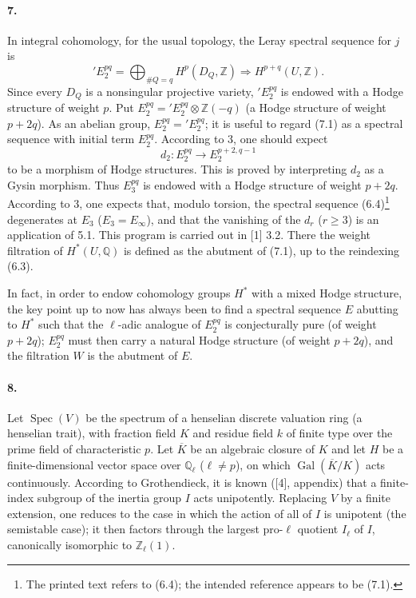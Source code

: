 \documentclass[10pt]{article}
\newcommand{\Q}{\mathbb Q}
\newcommand{\Z}{\mathbb Z}
\newcommand{\Ql}{\mathbb Q_\ell}
\newcommand{\Zl}{\mathbb Z_\ell}
\newcommand{\Gal}{\operatorname{Gal}}
\newcommand{\Spec}{\operatorname{Spec}}
\newcommand{\barK}{\overline{K}}
\begin{document}
\paragraph{7.} In integral cohomology, for the usual topology, the Leray spectral sequence for $j$ is
\[
\tag{7.1}
{}'E_2^{pq}=\bigoplus_{\#Q=q}H^p(D_Q,\Z)\Rightarrow H^{p+q}(U,\Z).
\]
Since every $D_Q$ is a nonsingular projective variety, ${}'E_2^{pq}$ is endowed with a Hodge structure of weight $p$. Put $E_2^{pq}={}'E_2^{pq}\otimes\Z(-q)$ (a Hodge structure of weight $p+2q$). As an abelian group, $E_2^{pq}={}'E_2^{pq}$; it is useful to regard (7.1) as a spectral sequence with initial term $E_2^{pq}$. According to 3, one should expect
\[
d_2:E_2^{pq}\to E_2^{p+2,q-1}
\]
to be a morphism of Hodge structures. This is proved by interpreting $d_2$ as a Gysin morphism. Thus $E_3^{pq}$ is endowed with a Hodge structure of weight $p+2q$. According to 3, one expects that, modulo torsion, the spectral sequence (6.4)\footnote{The printed text refers to (6.4); the intended reference appears to be (7.1).} degenerates at $E_3$ ($E_3=E_\infty$), and that the vanishing of the $d_r$ ($r\ge3$) is an application of 5.1. This program is carried out in [1] 3.2. There the weight filtration of $H^*(U,\Q)$ is defined as the abutment of (7.1), up to the reindexing (6.3).

In fact, in order to endow cohomology groups $H^*$ with a mixed Hodge structure, the key point up to now has always been to find a spectral sequence $E$ abutting to $H^*$ such that the $\ell$-adic analogue of $E_2^{pq}$ is conjecturally pure (of weight $p+2q$); $E_2^{pq}$ must then carry a natural Hodge structure (of weight $p+2q$), and the filtration $W$ is the abutment of $E$.

\paragraph{8.} Let $\Spec(V)$ be the spectrum of a henselian discrete valuation ring (a henselian trait), with fraction field $K$ and residue field $k$ of finite type over the prime field of characteristic $p$. Let $\barK$ be an algebraic closure of $K$ and let $H$ be a finite-dimensional vector space over $\Ql$ ($\ell\ne p$), on which $\Gal(\barK/K)$ acts continuously. According to Grothendieck, it is known ([4], appendix) that a finite-index subgroup of the inertia group $I$ acts unipotently. Replacing $V$ by a finite extension, one reduces to the case in which the action of all of $I$ is unipotent (the semistable case); it then factors through the largest pro-$\ell$ quotient $I_\ell$ of $I$, canonically isomorphic to $\Zl(1)$.
\end{document}
